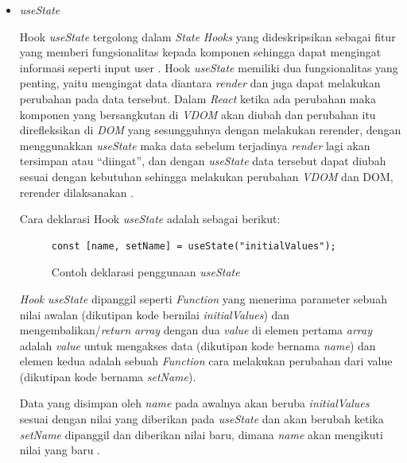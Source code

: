 \documentclass[a4paper]{article}
\begin{document}
\begin{enumerate}[label=\alph*. ]
\begin{enumerate}
\begin{itemize}
                        \item \textit{useState}

                        Hook \textit{useState} tergolong dalam \textit{State} \textit{Hooks} yang dideskripsikan sebagai fitur yang memberi fungsionalitas kepada komponen sehingga dapat mengingat informasi seperti input user \autocite{Banks_Porcello_2020}. Hook \textit{useState} memiliki dua fungsionalitas yang penting, yaitu mengingat data diantara \textit{render} dan juga dapat melakukan perubahan pada data tersebut. Dalam \textit{React} ketika ada perubahan maka komponen yang bersangkutan di \textit{VDOM} akan diubah dan perubahan itu direfleksikan di \textit{DOM} yang sesungguhnya dengan melakukan rerender, dengan menggunakkan \textit{useState} maka data sebelum terjadinya \textit{render} lagi akan tersimpan atau “diingat”, dan dengan \textit{useState} data tersebut dapat diubah sesuai dengan kebutuhan sehingga melakukan perubahan \textit{VDOM} dan DOM, rerender dilaksanakan \autocite{React_useState}.

                        Cara deklarasi Hook \textit{useState} adalah sebagai berikut:

                        \begin{figure}[h]
                            \centering
                            \begin{lstlisting}[language=HTML]
const [name, setName] = useState("initialValues");
                            \end{lstlisting}
                            \caption{Contoh deklarasi penggunaan \textit{useState}}
                        \end{figure}

                        \textit{Hook} \textit{useState} dipanggil seperti \textit{Function} yang menerima parameter sebuah nilai awalan (dikutipan kode bernilai \textit{initialValues}) dan mengembalikan/\textit{return} \textit{array} dengan dua \textit{value} di elemen pertama \textit{array} adalah \textit{value} untuk mengakses data (dikutipan kode bernama \textit{name}) dan elemen kedua adalah sebuah \textit{Function} cara melakukan perubahan dari value (dikutipan kode bernama \textit{setName}).

                        Data yang disimpan oleh \textit{name} pada awalnya akan beruba \textit{initialValues} sesuai dengan nilai yang diberikan pada \textit{useState} dan akan berubah ketika \textit{setName} dipanggil dan diberikan nilai baru, dimana \textit{name} akan mengikuti nilai yang baru \autocite{React_useState}.


\end{itemize}
\end{enumerate}
\end{enumerate}
\end{document}
